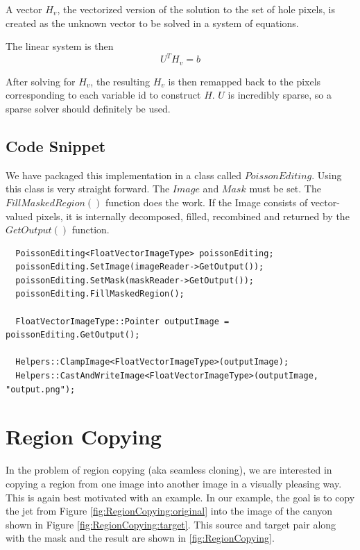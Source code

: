 \documentclass{InsightArticle}
\begin{document}
A vector $H_v$, the vectorized version of the solution to the set of hole pixels, is created as the unknown vector to be solved in a system of equations.

The linear system is then
\begin{equation}
 U^T H_v = b
\end{equation}

After solving for $H_v$, the resulting $H_v$ is then remapped back to the pixels corresponding to each variable id to construct $H$. $U$ is incredibly sparse, so a sparse solver should definitely be used.

\subsection{Code Snippet}
We have packaged this implementation in a class called $PoissonEditing$. Using this class is very straight forward. The $Image$ and $Mask$ must be set. The $FillMaskedRegion()$ function does the work. If the Image consists of vector-valued pixels, it is internally decomposed, filled, recombined and returned by the $GetOutput()$ function.

\begin{verbatim}
  PoissonEditing<FloatVectorImageType> poissonEditing;
  poissonEditing.SetImage(imageReader->GetOutput());
  poissonEditing.SetMask(maskReader->GetOutput());
  poissonEditing.FillMaskedRegion();

  FloatVectorImageType::Pointer outputImage = poissonEditing.GetOutput();

  Helpers::ClampImage<FloatVectorImageType>(outputImage);
  Helpers::CastAndWriteImage<FloatVectorImageType>(outputImage, "output.png");
\end{verbatim}


\section{Region Copying}
\label{sec:RegionCopying}
In the problem of region copying (aka seamless cloning), we are interested in copying a region from one image into another image in a visually pleasing way. This is again best motivated with an example. In our example, the goal is to copy the jet from Figure \ref{fig:RegionCopying:original} into the image of the canyon shown in Figure \ref{fig:RegionCopying:target}. This source and target pair along with the mask and the result are shown in \ref{fig:RegionCopying}.
\end{document}
